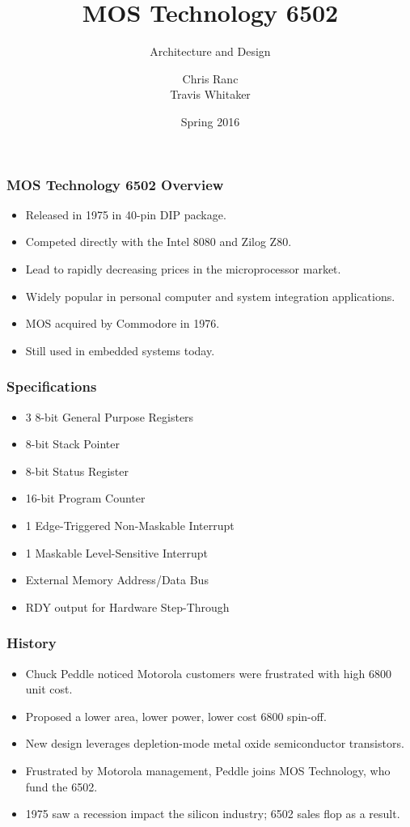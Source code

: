 \documentclass{beamer}
\begin{document}
\title{MOS Technology 6502}
\subtitle{Architecture and Design}
\author{Chris Ranc \\ Travis Whitaker}
\date{Spring 2016}
\maketitle

\begin{frame}
\frametitle{MOS Technology 6502 Overview}
\begin{itemize}
\item Released in 1975 in 40-pin DIP package.
\item Competed directly with the Intel 8080 and Zilog Z80.
\item Lead to rapidly decreasing prices in the microprocessor market.
\item Widely popular in personal computer and system integration applications.
\item MOS acquired by Commodore in 1976.
\item Still used in embedded systems today.
\end{itemize}
\end{frame}

\begin{frame}
\frametitle{Specifications}
\begin{itemize}
\item 3 8-bit General Purpose Registers
\item 8-bit Stack Pointer
\item 8-bit Status Register
\item 16-bit Program Counter
\item 1 Edge-Triggered Non-Maskable Interrupt
\item 1 Maskable Level-Sensitive Interrupt
\item External Memory Address/Data Bus
\item RDY output for Hardware Step-Through
\end{itemize}
\end{frame}

\begin{frame}
\frametitle{History}
\begin{itemize}
\item Chuck Peddle noticed Motorola customers were frustrated with high 6800 unit cost.
\item Proposed a lower area, lower power, lower cost 6800 spin-off.
\item New design leverages depletion-mode metal oxide semiconductor transistors.
\item Frustrated by Motorola management, Peddle joins MOS Technology, who fund the 6502.
\item 1975 saw a recession impact the silicon industry; 6502 sales flop as a result.
\end{itemize}
\end{frame}
\end{document}
